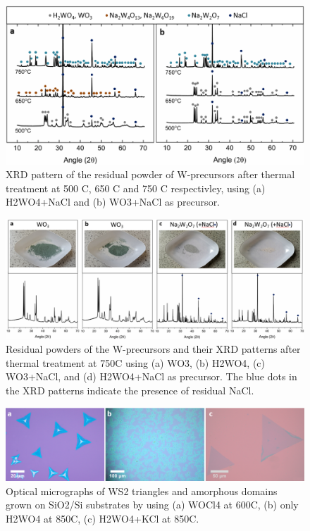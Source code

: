 \documentclass[12pt]{article}
\begin{document}
{\begin{figure}[h]
\begin{center}
\includegraphics[scale=0.3]{PaperSIXRD.png}
\caption{XRD pattern of the residual powder of W-precursors after thermal treatment at 500 {\degree}C, 650 {\degree}C and 750 {\degree}C respectivley, using (a) H2WO4+NaCl and (b) WO3+NaCl as precursor.}
\label{fig:PaperSIXRD}
\end{center}
\end{figure}

\begin{figure}[h]
\begin{center}
\includegraphics[scale=0.3]{PaperSIXRDOptical.png}
\caption{Residual powders of the W-precursors and their XRD patterns after thermal treatment at 750{\degree}C using (a) WO3, (b) H2WO4, (c) WO3+NaCl, and (d) H2WO4+NaCl as precursor. The blue dots in the XRD patterns indicate the presence of residual NaCl.}
\label{fig:PaperSIXRDOptical}
\end{center}
\end{figure}

\begin{figure}[h]
\begin{center}
\includegraphics[scale=0.3]{PaperSIOpticalPrecursors.png}
\caption{Optical micrographs of WS2 triangles and amorphous domains grown on SiO2/Si substrates by using (a) WOCl4 at 600{\degree}C, (b) only H2WO4 at 850{\degree}C, (c) H2WO4+KCl at 850{\degree}C.}
\label{fig:PaperSIOpticalPrecursors}
\end{center}
\end{figure}

}
\end{document}
